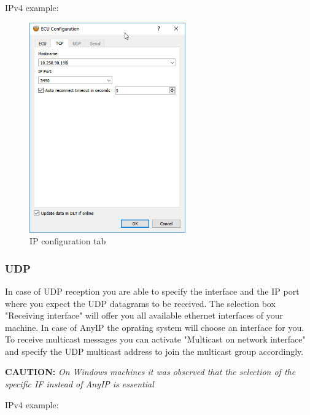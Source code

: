 \documentclass[a4paper,11pt]{article}
\newcommand{\caution}[1]{\begin{ibox} \textbf{CAUTION:} \emph{#1} \end{ibox}}
\begin{document}
IPv4 example:

\begin{figure}[h]
 \centering
 \includegraphics[width=0.6\textwidth]{images/tcp_applet01.png}
 \caption{IP configuration tab}
 \label{fig:ipconfigurationtab}
\end{figure}


\subsubsection{UDP}

In case of UDP reception you are able to specify the interface and the IP port where you expect the 
UDP datagrams to be received. The selection box "Receiving interface" will offer you all available 
ethernet interfaces of your machine. In case of AnyIP the oprating system will choose an interface for you.
To receive multicast messages you can activate "Multicast on network interface" and specify the UDP multicast address
to join the multicast group accordingly.

\caution{On Windows machines it was observed that the selection of the specific IF instead of AnyIP is essential}

IPv4 example:
\end{document}
